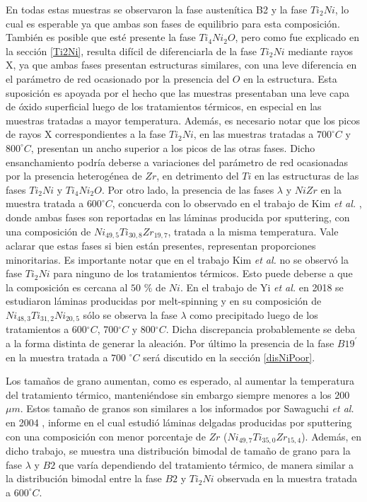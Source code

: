 \documentclass[12pt]{article}
\theoremstyle{definition}
\theoremstyle{remark}
\begin{document}
{En todas estas muestras se observaron la fase austenítica B2 y la fase $Ti_2Ni$, lo cual es esperable ya que ambas son fases de equilibrio para esta composición. También es posible que esté presente la fase $Ti_4Ni_2O$, pero como fue explicado en la sección \ref{Ti2Ni}, resulta difícil de diferenciarla de la fase $Ti_2Ni$ mediante rayos X, ya que ambas fases presentan estructuras similares, con una leve diferencia en el parámetro de red ocasionado por la presencia del $O$ en la estructura. Esta suposición es apoyada por el hecho que las muestras presentaban una leve capa de óxido superficial luego de los tratamientos térmicos, en especial en las muestras tratadas a mayor temperatura. Además, es necesario notar que los picos de rayos X correspondientes a la fase $Ti_2Ni$, en las muestras tratadas a $700 ^\circ C$ y $800 ^\circ C$, presentan un ancho superior a los picos de las otras fases. Dicho ensanchamiento podría deberse a variaciones del parámetro de red ocasionadas por la presencia heterogénea de $Zr$, en detrimento del $Ti$ en las estructuras de las fases $Ti_2Ni$ y $Ti_4Ni_2O$. Por otro lado, la presencia de las fases $\lambda$ y $NiZr$ en la muestra tratada a $600^\circ C$, concuerda con lo observado en el trabajo de Kim {\it et al.} \citep{HeeYoungKim2009}, donde ambas fases son reportadas en las láminas producida por sputtering, con una composición de $Ni_{49,5} Ti_{30,8} Zr_{19,7}$, tratada a la misma temperatura. Vale aclarar que estas fases si bien están presentes, representan proporciones minoritarias. Es importante notar que en el trabajo Kim {\it et al.} no se observó la fase $Ti_2Ni$ para ninguno de los tratamientos térmicos. Esto puede deberse a que la composición es cercana al $50$ $\%$ de $Ni$. En el trabajo de Yi {\it et al.} en 2018 \citep{XiaoyangYi2018} se estudiaron láminas producidas por melt-spinning y en su composición de $Ni_{48,3}Ti_{31,2}Ni_{20,5}$ sólo se observa la fase $\lambda$ como precipitado luego de los tratamientos a 600$^\circ C$, 700$^\circ C$ y 800$^\circ C$. Dicha discrepancia probablemente se deba a la forma distinta de generar la aleación. Por último la presencia de la fase $B19^{\prime}$ en la muestra tratada a $700$ $^\circ C$ será discutido en la sección \ref{disNiPoor}.


Los tamaños de grano aumentan, como es esperado, al aumentar la temperatura del tratamiento térmico, manteniéndose sin embargo siempre menores a los $200$ $\mu m$. Estos tamaño de granos son similares a los informados por Sawaguchi {\it et al.} en 2004 \citep{Sawaguchi2004}, informe en el cual estudió láminas delgadas producidas por sputtering con una composición con menor porcentaje de $Zr$ ($Ni_{49,7} Ti_{35,0} Zr_{15,4}$). Además, en dicho trabajo, se muestra una distribución bimodal de tamaño de grano para la fase $\lambda$ y $B2$  que varía dependiendo del tratamiento térmico, de manera similar a la distribución bimodal entre la fase $B2$ y $Ti_2 Ni$ observada en la muestra tratada a $600 ^\circ C$.} 
\end{document}
